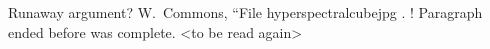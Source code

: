 \begin{texcode}[breaklines = true]
  Runaway argument?
  \BIBentryALTinterwordspacing W.~Commons,
  ``File hyperspectralcubejpg \ETC.
  ! Paragraph ended before \BR@c@bibitem was complete.
  <to be read again>
  \par
\end{texcode}